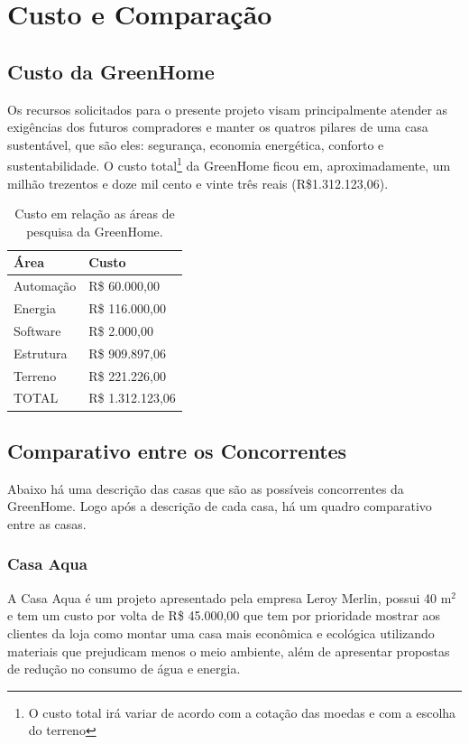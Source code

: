 \chapter[Comparativo]{Custo e Comparação}

\section{Custo da GreenHome}

Os recursos solicitados para o presente projeto visam principalmente atender as exigências dos futuros compradores e manter os quatros pilares de uma casa sustentável, que são eles: segurança, economia energética, conforto e sustentabilidade. O custo total\footnote{O custo total irá variar de acordo com a cotação das moedas e com a escolha do terreno} da GreenHome ficou em, aproximadamente, um milhão trezentos e doze mil cento e vinte três reais (R\$1.312.123,06).

\begin{table}[H]
	\centering
	\begin{tabular}{| p{5cm} | p{5cm} |}
		\hline 
		Área & Custo\tabularnewline
		\hline 
		\hline 
		Automação & R\$ 60.000,00\tabularnewline
		\hline 
		Energia & R\$ 116.000,00\tabularnewline
		\hline 
		Software & R\$ 2.000,00\tabularnewline
		\hline 
		Estrutura & R\$ 909.897,06 \tabularnewline
		\hline 
		Terreno & R\$ 221.226,00\tabularnewline
		\hline 
		TOTAL & R\$ 1.312.123,06 \tabularnewline
		\hline 
	\end{tabular}
\caption{Custo em relação as áreas de pesquisa da GreenHome.}
\end{table}


\section{Comparativo entre os Concorrentes}

Abaixo há uma descrição das casas que são as possíveis concorrentes da GreenHome. Logo após a descrição de cada casa, há um quadro comparativo entre as casas.

\subsection{Casa Aqua}

A Casa Aqua é um projeto apresentado pela empresa Leroy Merlin, possui 40 \si{\meter}$^2$ e tem um custo por volta de R\$ 45.000,00 que tem por prioridade mostrar aos clientes da loja como montar uma casa mais econômica e ecológica utilizando materiais que prejudicam menos o meio ambiente, além de apresentar propostas de redução no consumo de água e energia.


